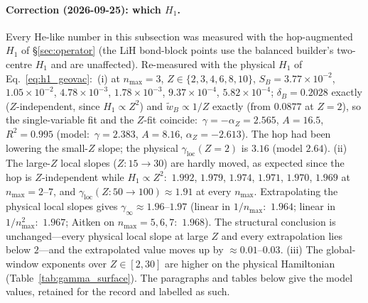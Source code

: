 \documentclass[twocolumn,pra,amsmath,amssymb,superscriptaddress]{revtex4-2}
\begin{document}
\paragraph*{Correction (2026-09-25): which $H_1$.}  Every He-like
number in this subsection was measured with the hop-augmented $H_1$ of
\S\ref{sec:operator} (the LiH bond-block points use the balanced
builder's two-centre $H_1$ and are unaffected).  Re-measured with the physical
$H_1$ of Eq.~\eqref{eq:h1_geovac}:\
(i) at $n_{\max}=3$, $Z\in\{2,3,4,6,8,10\}$, $S_B = 3.77\times10^{-2}$,
$1.05\times10^{-2}$, $4.78\times10^{-3}$, $1.78\times10^{-3}$,
$9.37\times10^{-4}$, $5.82\times10^{-4}$; $\delta_B = 0.2028$ exactly
($Z$-independent, since $H_1\propto Z^2$) and
$\tilde{w}_B \propto 1/Z$ exactly (from $0.0877$ at $Z=2$), so the
single-variable fit and the $Z$-fit coincide:\
$\gamma = -\alpha_Z = 2.565$, $A = 16.5$, $R^2 = 0.995$ (model:\
$\gamma = 2.383$, $A = 8.16$, $\alpha_Z = -2.613$).  The hop had been
lowering the small-$Z$ slope; the physical $\gamma_{\mathrm{loc}}(Z{=}2)$
is $3.16$ (model $2.64$).
(ii) The large-$Z$ local slopes ($Z:15\to30$) are hardly moved, as
expected since the hop is $Z$-independent while $H_1\propto Z^2$:\
$1.992$, $1.979$, $1.974$, $1.971$, $1.970$, $1.969$ at $n_{\max}=2$--$7$, and
$\gamma_{\mathrm{loc}}(Z{:}50\to100) \approx 1.91$ at every $n_{\max}$.
Extrapolating the physical local slopes gives
$\gamma_\infty \approx 1.96$--$1.97$ (linear in $1/n_{\max}$:\ $1.964$;
linear in $1/n_{\max}^2$:\ $1.967$; Aitken on $n_{\max}=5,6,7$:\
$1.968$).  The structural conclusion is unchanged---every physical local
slope at large $Z$ and every extrapolation lies below $2$---and the
extrapolated value moves up by $\approx 0.01$--$0.03$.
(iii) The global-window exponents over $Z\in[2,30]$ are higher on the
physical Hamiltonian (Table~\ref{tab:gamma_surface}).  The
paragraphs and tables below give the model values, retained for the
record and labelled as such.
\end{document}
